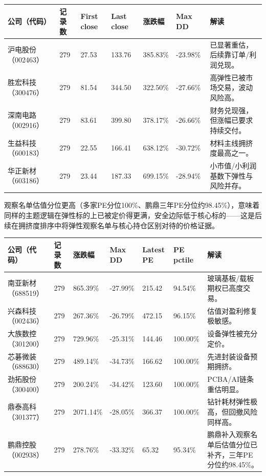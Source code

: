 \begin{exhibitbox}
\small
\begin{tabularx}{\textwidth}{L{1.8cm}R{1.6cm}R{1.7cm}R{1.9cm}R{1.9cm}R{1.8cm}X}
\toprule
\textbf{公司（代码）} & \textbf{记录数} & \textbf{First close} & \textbf{Last close} & \textbf{涨跌幅} & \textbf{Max DD} & \textbf{解读} \\
\midrule
沪电股份（002463） & 279 & 27.53 & 133.76 & 385.83\% & -23.98\% & 已显著重估，后续靠订单/利润兑现。 \\
胜宏科技（300476） & 279 & 81.54 & 344.50 & 322.50\% & -27.66\% & 高弹性已被市场交易，波动风险高。 \\
深南电路（002916） & 279 & 83.61 & 399.80 & 378.17\% & -26.66\% & 财务兑现强，但涨幅已要求持续交付。 \\
生益科技（600183） & 279 & 22.55 & 166.41 & 638.12\% & -30.72\% & 材料主线拥挤度最高之一。 \\
华正新材（603186） & 279 & 23.44 & 187.33 & 699.15\% & -28.94\% & 小市值/小利润基数下弹性与风险并存。 \\
\bottomrule
\end{tabularx}
\end{exhibitbox}

观察名单估值分位更高（多家PE分位100\%、鹏鼎三年PE分位约98.45\%），意味着同样的主题逻辑在弹性标的上已被定价得更满，安全边际低于核心标的——这是后续在拥挤度排序中将弹性观察名单与核心持仓区别对待的价格证据。

\begin{exhibitbox}
\footnotesize
\begin{tabularx}{\textwidth}{L{1.8cm}R{1.6cm}R{1.8cm}R{1.7cm}R{1.7cm}R{1.8cm}X}
\toprule
\textbf{公司（代码）} & \textbf{记录数} & \textbf{涨跌幅} & \textbf{Max DD} & \textbf{Latest PE} & \textbf{PE pctile} & \textbf{解读} \\
\midrule
南亚新材（688519） & 279 & 865.39\% & -27.99\% & 215.42 & 94.54\% & 玻璃基板/载板期权已高度交易。 \\
兴森科技（002436） & 279 & 267.36\% & -26.79\% & 472.15 & 96.15\% & 估值对盈利修复极敏感。 \\
大族数控（301200） & 279 & 729.96\% & -25.31\% & 144.46 & 100.00\% & 设备弹性被充分定价。 \\
芯碁微装（688630） & 279 & 489.14\% & -34.73\% & 166.62 & 100.00\% & 先进封装设备预期拥挤。 \\
劲拓股份（300400） & 279 & 200.24\% & -34.42\% & 123.60 & 100.00\% & PCBA/AI链条重估明显。 \\
鼎泰高科（301377） & 279 & 2071.14\% & -28.05\% & 366.37 & 100.00\% & 钻针耗材弹性极高，但回撤风险同样高。 \\
鹏鼎控股（002938） & 279 & 278.76\% & -33.32\% & 65.32 & 95.34\% & 鹏鼎补入观察名单后估值分位已补齐，三年PE分位约98.45\%。 \\
\bottomrule
\end{tabularx}
\end{exhibitbox}

